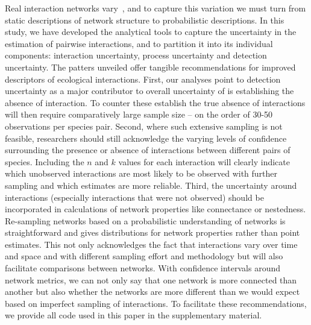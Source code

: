 \documentclass[12pt]{article}
\begin{document}
\begin{spacing}{2.0}
  Real interaction networks vary~\citep{Kitching1987,Olesen2011a,Pires2011a,Baiser2012,Fodrie2015,Novak2015}, and to capture this variation we must turn from static descriptions of network structure to probabilistic descriptions. In this study, we have developed the analytical tools to capture the uncertainty in the estimation of pairwise interactions, and to partition it into its individual components: interaction uncertainty, process uncertainty and detection uncertainty. The patters unveiled offer tangible recommendations for improved descriptors of ecological interactions. First, our analyses point to detection uncertainty as a major contributor to overall uncertainty of is establishing the absence of interaction. To counter these establish the true absence of interactions will then require comparatively large sample size – on the order of 30-50 observations per species pair. Second, where such extensive sampling is not feasible, researchers should still acknowledge the varying levels of confidence surrounding the presence or absence of interactions between different pairs of species. Including the $n$ and $k$ values for each interaction will clearly indicate which unobserved interactions are most likely to be observed with further sampling and which estimates are more reliable. Third, the uncertainty around interactions (especially interactions that were not observed) should be incorporated in calculations of network properties like connectance or nestedness. Re-sampling networks based on a probabilistic understanding of networks is straightforward and gives distributions for network properties rather than point estimates. This not only acknowledges the fact that interactions vary over time and space and with different sampling effort and methodology but will also facilitate comparisons between networks. With confidence intervals around network metrics, we can not only say that one network is more connected than another but also whether the networks are more different than we would expect based on imperfect sampling of interactions. To facilitate these recommendations, we provide all code used in this paper in the supplementary material. 




\end{spacing}
\end{document}
